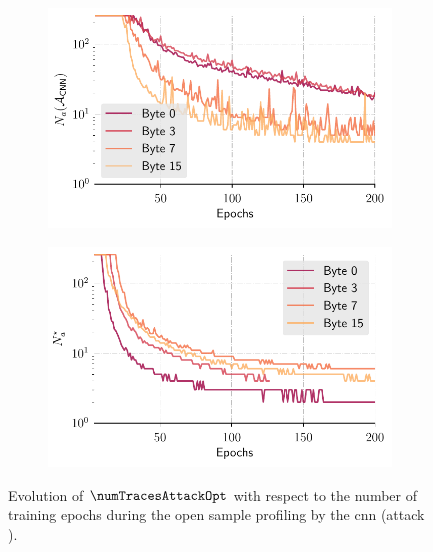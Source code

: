 \begin{figure}[t]
	\begin{subfigure}{0.49 \textwidth}
		\centering
		\includegraphics[width=\textwidth]{Figures/metrics/v1/history_na_sep}
		\caption{\mbedTLS{}}
		\label{fig:v1_Na_epochs}
	\end{subfigure}
	\begin{subfigure}{0.49 \textwidth}
		\centering
		\includegraphics[width=\textwidth]{Figures/metrics/v2/history_na_sep}
		\caption{\aeshuitbit{}}
		\label{fig:v2_Na_epochs}
	\end{subfigure}
	\caption{Evolution of \(\numTracesAttackOpt\) with respect to the number of
	training epochs during the open sample profiling by the \gls{cnn} (attack \attCNN{}).}
	\label{fig:res_cnns}
\end{figure}

